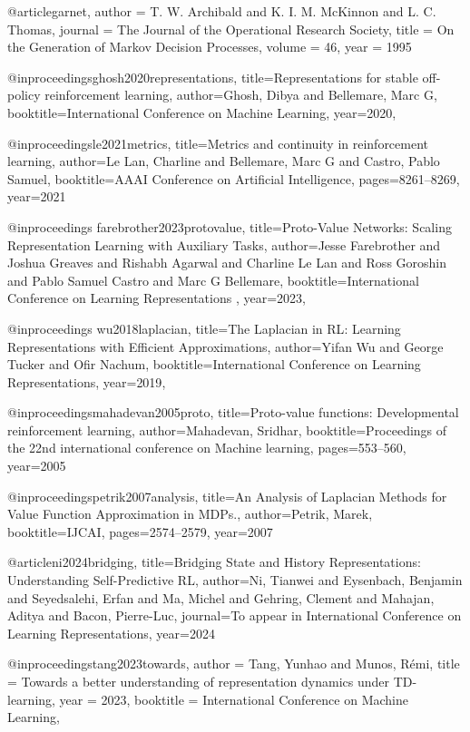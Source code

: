 @article{garnet,
author = {T. W. Archibald and K. I. M. McKinnon and L. C. Thomas},
journal = {The Journal of the Operational Research Society},
title = {On the Generation of Markov Decision Processes},
volume = {46},
year = {1995}
}

@inproceedings{ghosh2020representations,
  title={Representations for stable off-policy reinforcement learning},
  author={Ghosh, Dibya and Bellemare, Marc G},
  booktitle={International Conference on Machine Learning},
  year={2020},
}

@inproceedings{le2021metrics,
  title={Metrics and continuity in reinforcement learning},
  author={Le Lan, Charline and Bellemare, Marc G and Castro, Pablo Samuel},
  booktitle={AAAI Conference on Artificial Intelligence},
  pages={8261--8269},
  year={2021}
}

@inproceedings{
farebrother2023protovalue,
title={Proto-Value Networks: Scaling Representation Learning with Auxiliary Tasks},
author={Jesse Farebrother and Joshua Greaves and Rishabh Agarwal and Charline Le Lan and Ross Goroshin and Pablo Samuel Castro and Marc G Bellemare},
booktitle={International Conference on Learning Representations },
year={2023},
}

@inproceedings{
wu2018laplacian,
title={The Laplacian in {RL}: Learning Representations with Efficient Approximations},
author={Yifan Wu and George Tucker and Ofir Nachum},
booktitle={International Conference on Learning Representations},
year={2019},
}

@inproceedings{mahadevan2005proto,
  title={Proto-value functions: Developmental reinforcement learning},
  author={Mahadevan, Sridhar},
  booktitle={Proceedings of the 22nd international conference on Machine learning},
  pages={553--560},
  year={2005}
}

@inproceedings{petrik2007analysis,
  title={An Analysis of Laplacian Methods for Value Function Approximation in MDPs.},
  author={Petrik, Marek},
  booktitle={IJCAI},
  pages={2574--2579},
  year={2007}
}

@article{ni2024bridging,
  title={Bridging State and History Representations: Understanding Self-Predictive RL},
  author={Ni, Tianwei and Eysenbach, Benjamin and Seyedsalehi, Erfan and Ma, Michel and Gehring, Clement and Mahajan, Aditya and Bacon, Pierre-Luc},
  journal={To appear in International Conference on Learning Representations},
  year={2024}
}

@inproceedings{tang2023towards,
author = {Tang, Yunhao and Munos, R\'{e}mi},
title = {Towards a better understanding of representation dynamics under TD-learning},
year = {2023},
booktitle = {International Conference on Machine Learning},
}

